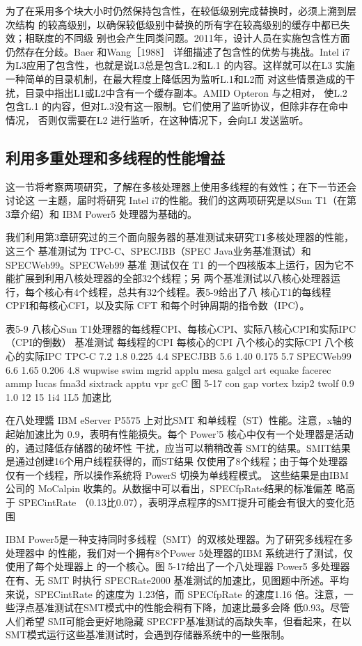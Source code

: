 为了在采用多个块大小时仍然保持包含性，在较低级别完成替换时，必须上溯到层次结构
的较高级别，以确保较低级别中替换的所有字在较高级别的缓存中都已失效；相联度的不同级
别也会产生同类问题。2011年，设计人员在实施包含性方面仍然存在分歧。Baer 和Wang［1988］
详细描述了包含性的优势与挑战。Intel i7 为L3应用了包含性，也就是说L3总是包含L.2和L.1
的内容。这样就可以在L3 实施一种简单的目录机制，在最大程度上降低因为监听L.1和L2而
对这些情景造成的干扰，目录中指出L1或L2中含有一个缓存副本。AMID Opteron 与之相对，
使L.2包含L.1 的内容，但对L.3没有这一限制。它们使用了监听协议，但除非存在命中情况，
否则仅需要在L2 进行监听，在这种情况下，会向LI 发送监听。

\subsection{利用多重处理和多线程的性能增益}
这一节将考察两项研究，了解在多核处理器上使用多线程的有效性；在下一节还会讨论这
一主题，届时将研究 Intel i7的性能。我们的这两项研究是以Sun T1（在第3章介绍）和 IBM Power5
处理器为基础的。

我们利用第3章研究过的三个面向服务器的基准测试来研究T1多核处理器的性能，这三个
基准测试为 TPC-C、SPECJBB（SPEC Java业务基准测试）和SPECWeb99。SPECWeb99 基准
测试仅在 T1 的一个四核版本上运行，因为它不能扩展到利用八核处理器的全部32个线程；另
两个基准测试以八核心处理器运行，每个核心有4个线程，总共有32个线程。表5-9给出了八
核心T1的每线程 CPFI和每核心CFI，以及实际 CFT 和每个时钟周期的指令数（IPC）。

表5-9 八核心Sun T1处理器的每线程CPI、每核心CPI、实际八核心CPI和实际IPC（CPI的倒数）
基准测试
每线程的CPI
每核心的CPI
八个核心的实际CPI
八个核心的实际IPC
TPC-C
7.2
1.8
0.225
4.4
SPECJBB
5.6
1.40
0.175
5.7
SPECWeb99
6.6
1.65
0.206
4.8
wupwise
swim
mgrid
applu
mesa
galgcl
art
equake
facerec
ammp
lucas
fma3d
sixtrack
apptu
vpr
gcC
图 5-17
con
gap
vortex
bzip2
twolf
0.9
1.0
12
15
1i4
1L5
加速比

在八处理醬 IBM eServer P5575 上对比SMT 和单线程（ST）性能。注意，x轴的起始加速比为
0.9，表明有性能损失。每个 Power'5 核心中仅有一个处理器是活动的，通过降低存储器的破坏性
干扰，应当可以稍稍改善 SMT的结果。SMIT结果是通过创建16个用户线程获得的，而ST结果
仅使用了8个线程；由于每个处理器仅有一个线程，所以操作系统将 PowerS 切换为单线程模式。
这些结果是由IBM 公司的 MoCalpin 收集的。从数据中可以看出，SPECfpRate结果的标准偏差
略高于 SPECintRate （0.13比0.07），表明浮点程序的SMT提升可能会有很大的变化范围

IBM Power5是一种支持同时多线程（SMT）的双核处理器。为了研究多线程在多处理器中
的性能，我们对一个拥有8个Power 5处理器的IBM 系统进行了测试，仅使用了每个处理器上
的一个核心。图 5-17给出了一个八处理器 Power5 多处理器在有、无 SMT 时执行 SPECRate2000
基准测试的加速比，见图题中所述。平均来说，SPECintRate 的速度为 1.23倍，而 SPECfpRate
的速度1.16 倍。注意，一些浮点基准测试在SMT模式中的性能会稍有下降，加速比最多会降
低0.93。尽管人们希望 SMI可能会更好地隐藏 SPECFP基准测试的高缺失率，但看起来，在以
SMT模式运行这些基准测试时，会遇到存储器系统中的一些限制。


